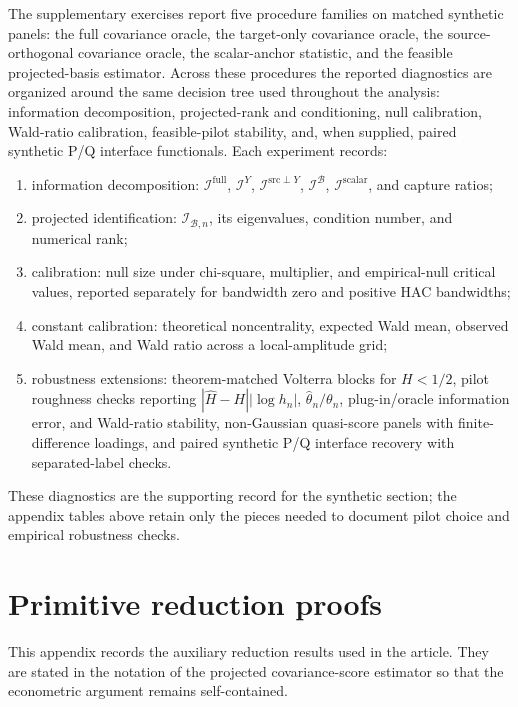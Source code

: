 \documentclass[11pt,a4paper]{amsart}
\theoremstyle{plain}
\theoremstyle{definition}
\theoremstyle{remark}
\newcommand{\scrB}{\mathcal{B}}
\newcommand{\scrI}{\mathcal{I}}
\begin{document}
The supplementary exercises report five procedure families on matched synthetic panels: the full
covariance oracle, the target-only covariance oracle, the source-orthogonal covariance oracle, the
scalar-anchor statistic, and the feasible projected-basis estimator.  Across these procedures the
reported diagnostics are organized around the same decision tree used throughout the analysis:
information decomposition, projected-rank and conditioning, null calibration, Wald-ratio
calibration, feasible-pilot stability, and, when supplied, paired synthetic P/Q interface
functionals.  Each experiment records:
\begin{enumerate}[label=(\roman*)]
\item information decomposition: \(\scrI^{\mathrm{full}}\), \(\scrI^{Y}\),
\(\scrI^{\mathrm{src}\perp Y}\), \(\scrI^{\scrB}\), \(\scrI^{\mathrm{scalar}}\), and capture ratios;
\item projected identification: \(\scrI_{\scrB,n}\), its eigenvalues, condition number, and
numerical rank;
\item calibration: null size under chi-square, multiplier, and empirical-null critical values,
reported separately for bandwidth zero and positive HAC bandwidths;
\item constant calibration: theoretical noncentrality, expected Wald mean, observed Wald mean, and
Wald ratio across a local-amplitude grid;
\item robustness extensions: theorem-matched Volterra blocks for \(H<1/2\), pilot roughness checks
reporting \(|\widehat H-H||\log h_n|\), \(\widehat\theta_n/\theta_n\), plug-in/oracle information
error, and Wald-ratio stability, non-Gaussian quasi-score panels with finite-difference loadings,
and paired synthetic P/Q interface recovery with separated-label checks.
\end{enumerate}
These diagnostics are the supporting record for the synthetic section; the appendix tables
above retain only the pieces needed to document pilot choice and empirical robustness checks.

\section{Primitive reduction proofs}\label{app:primitive-proof-modules}

This appendix records the auxiliary reduction results used in the article.  They are stated in
the notation of the projected covariance-score estimator so that the econometric argument remains
self-contained.
\end{document}
